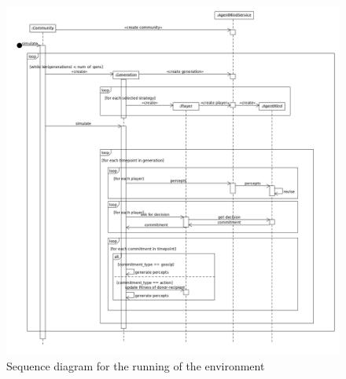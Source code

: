 \documentclass[twoside,twocolumn]{article}
\begin{document}

{}



\newpage

\begin{figure}
	\includegraphics[width=1\textwidth]{EnvSequence.png}
	\caption{Sequence diagram for the running of the environment}
	\label{fig:env_class}
\end{figure}
\end{document}

